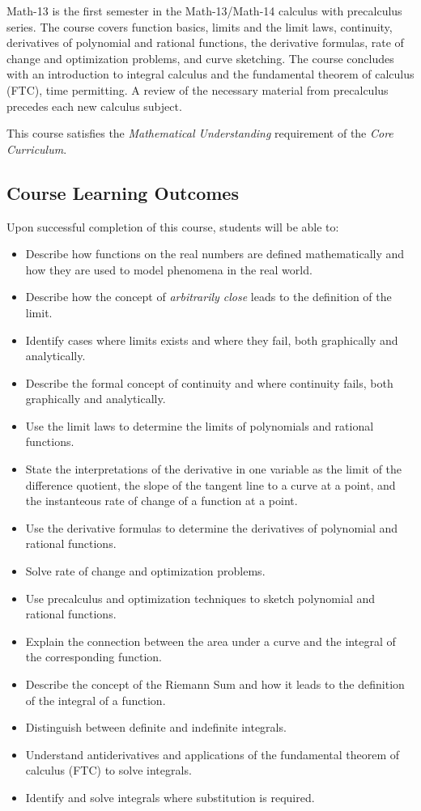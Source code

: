 \documentclass[letterpaper,12pt,fleqn]{article}
\begin{document}
Math-13 is the first semester in the Math-13/Math-14 calculus with precalculus series.  The course covers function
basics, limits and the limit laws, continuity, derivatives of polynomial and rational functions, the derivative
formulas, rate of change and optimization problems, and curve sketching.  The course concludes with an introduction
to integral calculus and the fundamental theorem of calculus (FTC), time permitting.  A review of the necessary
material from precalculus precedes each new calculus subject.

This course satisfies the \emph{Mathematical Understanding} requirement of the \emph{Core Curriculum}.

\subsection*{Course Learning Outcomes}

Upon successful completion of this course, students will be able to:
\begin{itemize}
\item Describe how functions on the real numbers are defined mathematically and how they are used to model
  phenomena in the real world.
\item Describe how the concept of \emph{arbitrarily close} leads to the definition of the limit.
\item Identify cases where limits exists and where they fail, both graphically and analytically.
\item Describe the formal concept of continuity and where continuity fails, both graphically and analytically.
\item Use the limit laws to determine the limits of polynomials and rational functions.
\item State the interpretations of the derivative in one variable as the limit of the difference quotient, the
  slope of the tangent line to a curve at a point, and the instanteous rate of change of a function at a point.
\item Use the derivative formulas to determine the derivatives of polynomial and rational functions.
\item Solve rate of change and optimization problems.
\item Use precalculus and optimization techniques to sketch polynomial and rational functions.
\item Explain the connection between the area under a curve and the integral of the corresponding function.
\item Describe the concept of the Riemann Sum and how it leads to the definition of the integral of a function.
\item Distinguish between definite and indefinite integrals.
\item Understand antiderivatives and applications of the fundamental theorem of calculus (FTC) to solve integrals.
\item Identify and solve integrals where substitution is required.
\end{itemize}
\end{document}
